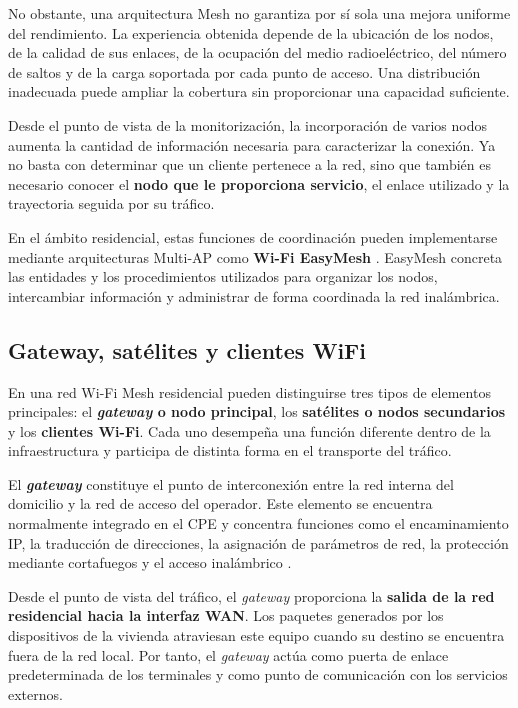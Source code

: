 No obstante, una arquitectura Mesh no garantiza por sí sola una mejora
uniforme del rendimiento. La experiencia obtenida depende de la
ubicación de los nodos, de la calidad de sus enlaces, de la ocupación del
medio radioeléctrico, del número de saltos y de la carga soportada por
cada punto de acceso. Una distribución inadecuada puede ampliar la
cobertura sin proporcionar una capacidad suficiente.

Desde el punto de vista de la monitorización, la incorporación de varios
nodos aumenta la cantidad de información necesaria para caracterizar la
conexión. Ya no basta con determinar que un cliente pertenece a la red,
sino que también es necesario conocer el
\textbf{nodo que le proporciona servicio}, el enlace utilizado y la
trayectoria seguida por su tráfico.

En el ámbito residencial, estas funciones de coordinación pueden
implementarse mediante arquitecturas Multi-AP como
\textbf{Wi-Fi EasyMesh} \cite{wifi_alliance_easymesh}. EasyMesh concreta
las entidades y los procedimientos utilizados para organizar los nodos,
intercambiar información y administrar de forma coordinada la red
inalámbrica.

\subsection{Gateway, satélites y clientes WiFi}
\label{subsec:gateway-satelites-clientes-wifi}

En una red Wi-Fi Mesh residencial pueden distinguirse tres tipos de
elementos principales: el \textbf{\textit{gateway} o nodo principal}, los
\textbf{satélites o nodos secundarios} y los
\textbf{clientes Wi-Fi}. Cada uno desempeña una función diferente dentro
de la infraestructura y participa de distinta forma en el transporte del
tráfico.

El \textbf{\textit{gateway}} constituye el punto de interconexión entre
la red interna del domicilio y la red de acceso del operador. Este
elemento se encuentra normalmente integrado en el CPE y concentra
funciones como el encaminamiento IP, la traducción de direcciones, la
asignación de parámetros de red, la protección mediante cortafuegos y el
acceso inalámbrico \cite{bbf_tr124_i9}.

Desde el punto de vista del tráfico, el \textit{gateway} proporciona la
\textbf{salida de la red residencial hacia la interfaz WAN}. Los paquetes
generados por los dispositivos de la vivienda atraviesan este equipo
cuando su destino se encuentra fuera de la red local. Por tanto, el
\textit{gateway} actúa como puerta de enlace predeterminada de los
terminales y como punto de comunicación con los servicios externos.

